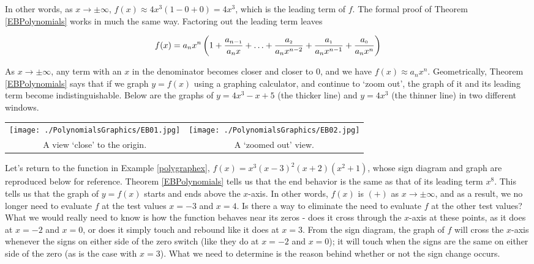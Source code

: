 \smallskip

In other words, as $x \rightarrow \pm \infty$, $f(x) \approx 4x^3\left( 1 - 0 +0\right) = 4x^3$, which is the leading term of $f$.  The formal proof of Theorem \ref{EBPolynomials} works in much the same way.  Factoring out the leading term leaves

\[ f(x) = a_{n} x^{n} \left( 1 + \dfrac{a_{n-\mbox{\tiny$1$}}}{a_{n} x}+ \ldots + \dfrac{a_{\mbox{\tiny$2$}}}{a_{n} x^{n-2}} + \dfrac{a_{\mbox{\tiny$1$}}}{a_{n} x^{n-1}}+\dfrac{a_{\mbox{\tiny$0$}}}{a_{n} x^{n}}\right)\]

As $x \rightarrow \pm \infty$, any term with an $x$ in the denominator becomes closer and closer to $0$, and we have $f(x) \approx a_{n} x^{n}$.  Geometrically, Theorem \ref{EBPolynomials} says that if we graph $y=f(x)$ using a graphing calculator, and continue to `zoom out', the graph of it and its leading term become indistinguishable.  Below are the graphs of $y=4x^3-x+5$ (the thicker line) and $y=4x^3$ (the thinner line) in two different windows.

\begin{center}

\begin{tabular}{cc}

\texttt{[image: ./PolynomialsGraphics/EB01.jpg]} \hspace{.25in} & \texttt{[image: ./PolynomialsGraphics/EB02.jpg]} \\

A view `close' to the origin. \hspace{.25in} & A `zoomed out' view. \\

\end{tabular}

\end{center}

Let's return to the function in Example \ref{polygraphex}, $f(x) = x^3 (x-3)^2 (x+2)\left(x^2+1\right)$, whose sign diagram and graph are reproduced below for reference.  Theorem \ref{EBPolynomials} tells us that the end behavior is the same as that of its leading term $x^{8}$.  This tells us that the graph of $y=f(x)$ starts and ends above the $x$-axis.  In other words, $f(x)$ is $(+)$ as $x \rightarrow \pm \infty$, and as a result, we no longer need to evaluate $f$ at the test values $x=-3$ and $x=4$.  Is there a way to eliminate the need to evaluate $f$ at the other test values?  What we would really need to know is how the function behaves near its zeros - does it cross through the $x$-axis at these points, as it does at $x=-2$ and $x=0$, or does it simply touch and rebound like it does at $x=3$.  From the sign diagram, the graph of $f$ will cross the $x$-axis whenever the signs on either side of the zero switch (like they do at $x=-2$ and $x=0$);  it will touch when the signs are the same on either side of the zero (as is the case with $x=3$). What we need to determine is the reason behind whether or not the sign change occurs.

